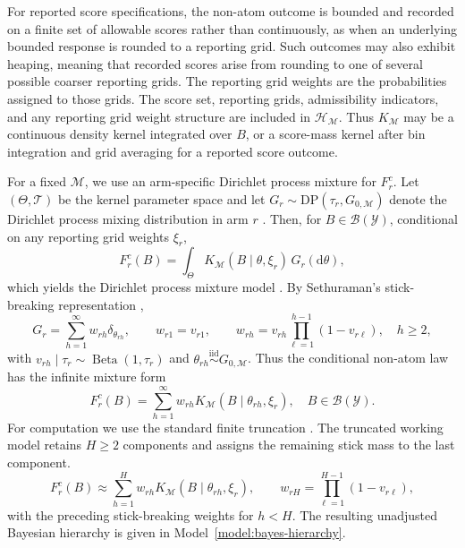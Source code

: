 \documentclass[11pt]{article}
\DeclareMathOperator{\Beta}{Beta}
\begin{document}
For reported score specifications, the non-atom outcome is bounded and recorded on a
finite set of allowable scores rather than continuously, as when an underlying
bounded response is rounded to a reporting grid. Such outcomes may also exhibit
heaping, meaning that recorded scores arise from rounding to one of several
possible coarser reporting grids. The reporting grid weights are the probabilities
assigned to those grids. The score set, reporting grids, admissibility
indicators, and any reporting grid weight structure are included in
$\mathcal{H}_{\mathcal{M}}$. Thus $K_{\mathcal{M}}$ may be a continuous density
kernel integrated over $B$, or a score-mass kernel after bin integration and
grid averaging for a reported score outcome.

For a fixed $\mathcal{M}$, we use an arm-specific Dirichlet process mixture for
$F_r^c$. Let $(\Theta,\mathcal{T})$ be the kernel parameter space and let
$G_r\sim\mathrm{DP}(\tau_r,G_{0,\mathcal{M}})$ denote the Dirichlet process
mixing distribution in arm $r$ \citep{ferguson1973bayesian}. Then, for
$B\in\mathcal{B}(\mathcal{Y})$, conditional on any reporting grid weights
$\xi_r$,
\[
  F_r^c(B)
  =
  \int_{\Theta} K_{\mathcal{M}}(B \mid \theta,\xi_r)\,G_r(\mathrm d\theta),
\]
which yields the Dirichlet process mixture model \citep{antoniak1974mixtures}.
By Sethuraman's stick-breaking representation \citep{sethuraman1994constructive},
\[
  G_r=\sum_{h=1}^{\infty}w_{rh}\delta_{\theta_{rh}},
  \qquad
  w_{r1}=v_{r1},
  \qquad
  w_{rh}=v_{rh}\prod_{\ell=1}^{h-1}(1-v_{r\ell}),\quad h\geq2,
\]
with $v_{rh}\mid\tau_r\sim\Beta(1,\tau_r)$ and
$\theta_{rh}\stackrel{\mathrm{iid}}{\sim}G_{0,\mathcal{M}}$. Thus the
conditional non-atom law has the infinite mixture form
\[
  F_r^c(B)
  =
  \sum_{h=1}^{\infty}
  w_{rh}K_{\mathcal{M}}(B\mid\theta_{rh},\xi_r),
  \quad B\in\mathcal{B}(\mathcal{Y}).
\]
For computation we use the standard finite truncation
\citep{ishwaran2001gibbs}. The truncated working model retains
$H\geq2$ components and assigns the remaining stick mass to the last component.
\[
  F_r^c(B)
  \approx
  \sum_{h=1}^{H}w_{rh}K_{\mathcal{M}}(B\mid\theta_{rh},\xi_r),
  \qquad
  w_{rH}=\prod_{\ell=1}^{H-1}(1-v_{r\ell}),
\]
with the preceding stick-breaking weights for $h<H$. The resulting
unadjusted Bayesian hierarchy is given in Model~\ref{model:bayes-hierarchy}.
\end{document}

